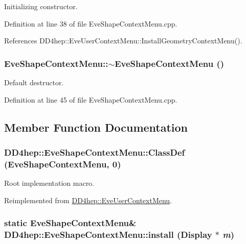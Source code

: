 Initializing constructor. 

Definition at line 38 of file EveShapeContextMenu.cpp.

References DD4hep::EveUserContextMenu::InstallGeometryContextMenu().\hypertarget{class_d_d4hep_1_1_eve_shape_context_menu_a9e82222657b2932cbdaacf941ca68359}{
\subsubsection[{$\sim$EveShapeContextMenu}]{\setlength{\rightskip}{0pt plus 5cm}EveShapeContextMenu::$\sim$EveShapeContextMenu ()}}
\label{class_d_d4hep_1_1_eve_shape_context_menu_a9e82222657b2932cbdaacf941ca68359}


Default destructor. 

Definition at line 45 of file EveShapeContextMenu.cpp.

\subsection{Member Function Documentation}
\hypertarget{class_d_d4hep_1_1_eve_shape_context_menu_a265ec0c7f5d3dd2f384958e32e5c51d9}{
\subsubsection[{ClassDef}]{\setlength{\rightskip}{0pt plus 5cm}DD4hep::EveShapeContextMenu::ClassDef ({\bf EveShapeContextMenu}, \/  0)}}
\label{class_d_d4hep_1_1_eve_shape_context_menu_a265ec0c7f5d3dd2f384958e32e5c51d9}


Root implementation macro. 

Reimplemented from \hyperlink{class_d_d4hep_1_1_eve_user_context_menu_a05246cb30938d2a51dbb68468a3e8f8f}{DD4hep::EveUserContextMenu}.\hypertarget{class_d_d4hep_1_1_eve_shape_context_menu_adba9c9e666dc1c52775f59e1a423e3fa}{
\subsubsection[{install}]{\setlength{\rightskip}{0pt plus 5cm}static {\bf EveShapeContextMenu}\& DD4hep::EveShapeContextMenu::install ({\bf Display} $\ast$ {\em m})}}
\label{class_d_d4hep_1_1_eve_shape_context_menu_adba9c9e666dc1c52775f59e1a423e3fa}


